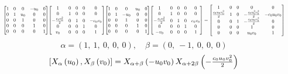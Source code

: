 \documentclass[11pt]{article}
\theoremstyle{definition}
\begin{document}
\[
\scaletoalign{\textwidth}{{\left[\begin{matrix}1 & 0 & 0 & - u_{0} & 0\\0 & 1 & u_{0} & 0 & 0\\0 & 0 & 1 & 0 & 0\\0 & 0 & 0 & 1 & 0\\0 & 0 & 0 & 0 & 1\end{matrix}\right]} {\left[\begin{matrix}1 & 0 & 0 & 0 & 0\\0 & 1 & 0 & 0 & 0\\- \frac{c_{0} v_{0}^{2}}{2} & 0 & 1 & 0 & - c_{0} v_{0}\\0 & 0 & 0 & 1 & 0\\v_{0} & 0 & 0 & 0 & 1\end{matrix}\right]} {\left[\begin{matrix}1 & 0 & 0 & u_{0} & 0\\0 & 1 & - u_{0} & 0 & 0\\0 & 0 & 1 & 0 & 0\\0 & 0 & 0 & 1 & 0\\0 & 0 & 0 & 0 & 1\end{matrix}\right]} {\left[\begin{matrix}1 & 0 & 0 & 0 & 0\\0 & 1 & 0 & 0 & 0\\- \frac{c_{0} v_{0}^{2}}{2} & 0 & 1 & 0 & c_{0} v_{0}\\0 & 0 & 0 & 1 & 0\\- v_{0} & 0 & 0 & 0 & 1\end{matrix}\right]} = {\left[\begin{matrix}1 & 0 & 0 & 0 & 0\\\frac{c_{0} u_{0} v_{0}^{2}}{2} & 1 & 0 & - \frac{c_{0} u_{0}^{2} v_{0}^{2}}{2} & - c_{0} u_{0} v_{0}\\0 & 0 & 1 & - \frac{c_{0} u_{0} v_{0}^{2}}{2} & 0\\0 & 0 & 0 & 1 & 0\\0 & 0 & 0 & u_{0} v_{0} & 1\end{matrix}\right]}}
\]
\[
\alpha = \left( 1, \  1, \  0, \  0, \  0\right), \quad \beta = \left( 0, \  -1, \  0, \  0, \  0\right)
\]
\[
\scaletoalign{\textwidth}{\left[ X_{\alpha}\left(u_{0}\right), X_{\beta}\left(v_{0}\right) \right] = X_{\alpha + \beta}\left(- u_{0} v_{0}\right) X_{\alpha + 2\beta}\left(- \frac{c_{0} u_{0} v_{0}^{2}}{2}\right)}
\]
\end{document}
